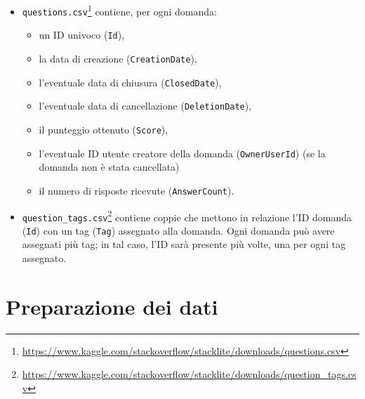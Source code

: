 \documentclass[
  a4paper,            %
  10pt                %
]{article}
\begin{document}
  \begin{itemize}
    \item
      \texttt{questions.csv}\footnote{\url{https://www.kaggle.com/stackoverflow/stacklite/downloads/questions.csv}} contiene, per ogni domanda:
      \begin{itemize}
        \item un ID univoco (\texttt{Id}),
        \item la data di creazione (\texttt{CreationDate}),
        \item l'eventuale data di chiusura (\texttt{ClosedDate}),
        \item l'eventuale data di cancellazione (\texttt{DeletionDate}),
        \item il punteggio ottenuto (\texttt{Score}),
        \item l'eventuale ID utente creatore della domanda (\texttt{OwnerUserId}) (se la domanda non è stata cancellata)
        \item il numero di risposte ricevute (\texttt{AnswerCount}).
      \end{itemize}
    \item
      \texttt{question\_tags.csv}\footnote{\url{https://www.kaggle.com/stackoverflow/stacklite/downloads/question_tags.csv}}
      contiene coppie che mettono in relazione l'ID domanda (\texttt{Id}) con un tag (\texttt{Tag}) assegnato alla domanda.
      Ogni domanda può avere assegnati più tag; in tal caso, l'ID sarà presente più volte, una per ogni tag assegnato.

  \end{itemize}

  \section{Preparazione dei dati}\label{sec:preparation}
\end{document}
